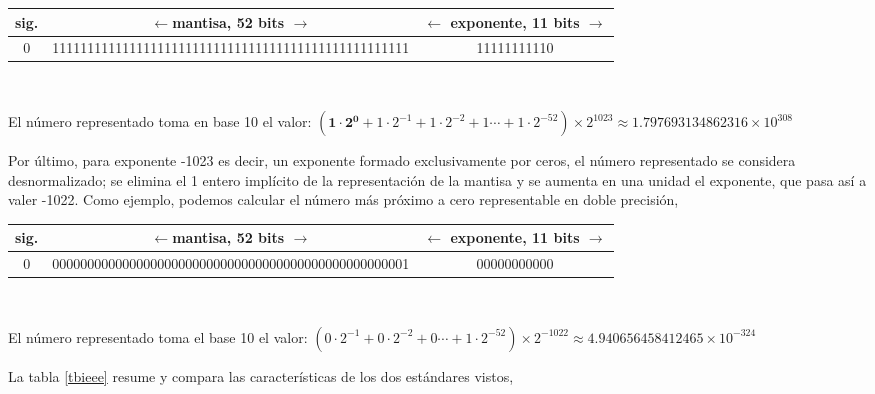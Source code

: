 \begin{tabular}{|c||c||c|}
\hline
sig.&$\leftarrow$mantisa, 52 bits $\rightarrow$&$\leftarrow$ exponente, 11 bits $\rightarrow$\\
\hline
0&111111111111111111111111111111111111111111111111111&11111111110\\
\hline
\end{tabular}\\
\begin{paracol}{2}
El número representado toma en base 10 el valor: $(\mathbf{1\cdot2^0}+1\cdot2^{-1}+1\cdot2^{-2}+1\cdots+1\cdot2^{-52})\times2^{1023}\approx 1.797693134862316\times10^{308}$

Por último, para exponente -1023 es decir, un exponente formado exclusivamente por ceros, el número representado se considera desnormalizado; se elimina el 1 entero implícito de la representación de la mantisa y se aumenta en una unidad el exponente, que pasa así a valer -1022.  Como ejemplo, podemos calcular el número más próximo a cero representable en doble precisión,\\
\end{paracol}
\begin{tabular}{|c||c||c|}
\hline
sig.&$\leftarrow$mantisa, 52 bits $\rightarrow$&$\leftarrow$ exponente, 11 bits $\rightarrow$\\
\hline
0&000000000000000000000000000000000000000000000000001&00000000000\\
\hline
\end{tabular}\\
\begin{paracol}{2}
El número representado toma el base 10 el valor: $(0\cdot2^{-1}+0\cdot2^{-2}+0\cdots+1\cdot2^{-52})\times2^{-1022}\approx  4.940656458412465\times10^{-324}$

La tabla \ref{tbieee} resume y compara las características de los dos estándares vistos,
\end{paracol}

